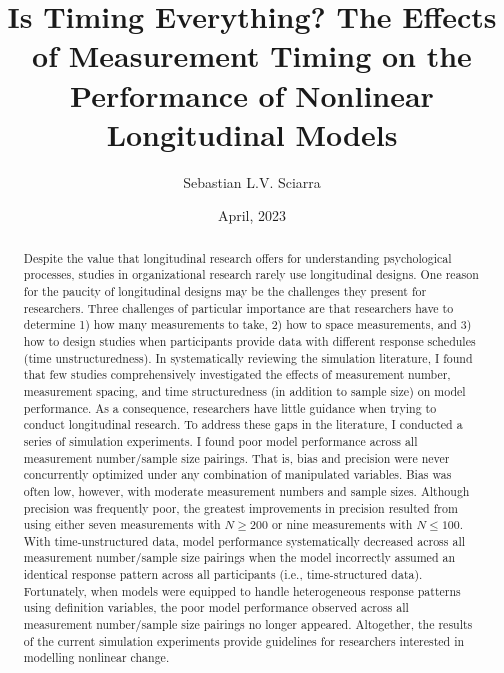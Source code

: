 \documentclass[
12pt, %
twoside,
english]{guelphthesis}
\title{Is Timing Everything? The Effects of Measurement Timing on the Performance of Nonlinear Longitudinal Models}
\author{Sebastian L.V. Sciarra}
\date{April, 2023}
\let\cleardoublepage\clearpage
\let\oldfrontmatter\frontmatter
\renewcommand{\frontmatter}{
  \oldfrontmatter
  
  
   \pagestyle{frontmatter} %
}
\begin{document}
\frontmatter %

  \maketitle

\setcounter{page}{2} %

\cleardoublepage
  \begin{abstract}{2}{Despite the value that longitudinal research offers for understanding psychological processes, studies in organizational research rarely use longitudinal designs. One reason for the paucity of longitudinal designs may be the challenges they present for researchers. Three challenges of particular importance are that researchers have to determine 1) how many measurements to take, 2) how to space measurements, and 3) how to design studies when participants provide data with different response schedules (time unstructuredness). In systematically reviewing the simulation literature, I found that few studies comprehensively investigated the effects of measurement number, measurement spacing, and time structuredness (in addition to sample size) on model performance. As a consequence, researchers have little guidance when trying to conduct longitudinal research. To address these gaps in the literature, I conducted a series of simulation experiments. I found poor model performance across all measurement number/sample size pairings. That is, bias and precision were never concurrently optimized under any combination of manipulated variables. Bias was often low, however, with moderate measurement numbers and sample sizes. Although precision was frequently poor, the greatest improvements in precision resulted from using either seven measurements with \(N \ge 200\) or nine measurements with \(N \le 100\). With time-unstructured data, model performance systematically decreased across all measurement number/sample size pairings when the model incorrectly assumed an identical response pattern across all participants (i.e., time-structured data). Fortunately, when models were equipped to handle heterogeneous response patterns using definition variables, the poor model performance observed across all measurement number/sample size pairings no longer appeared. Altogether, the results of the current simulation experiments provide guidelines for researchers interested in modelling nonlinear change.}  %
  \end{abstract}
\end{document}
